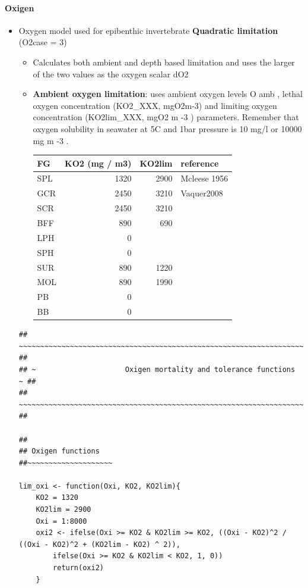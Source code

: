 \documentclass[11pt]{article}
\begin{document}
\paragraph*{Oxigen}
\label{sec-5-2-1-14}
\begin{itemize}

\item Oxygen model used for epibenthic invertebrate \textbf{Quadratic limitation} (O2case = 3)
\label{sec-5-2-1-14-1}%
\begin{itemize}
\item Calculates both ambient and depth based limitation and uses the larger of the two values as the oxygen scalar dO2
\item \textbf{Ambient oxygen limitation}: uses ambient oxygen levels O amb , lethal oxygen concentration (KO2\_XXX, mgO2m-3) and limiting oxygen concentration (KO2lim\_XXX, mgO2 m -3 ) parameters. Remember that oxygen solubility in seawater at 5C and 1bar pressure is 10 mg/l or 10000 mg m -3 .

\begin{center}
\begin{tabular}{lrrl}
 FG   &  KO2 (mg / m3)  &  KO2lim  &  reference     \\
\hline
 SPL  &           1320  &    2900  &  Mcleese 1956  \\
 GCR  &           2450  &    3210  &  Vaquer2008    \\
 SCR  &           2450  &    3210  &                \\
 BFF  &            890  &     690  &                \\
 LPH  &              0  &          &                \\
 SPH  &              0  &          &                \\
 SUR  &            890  &    1220  &                \\
 MOL  &            890  &    1990  &                \\
 PB   &              0  &          &                \\
 BB   &              0  &          &                \\
\end{tabular}
\end{center}


\end{itemize}




\begin{verbatim}
## ~~~~~~~~~~~~~~~~~~~~~~~~~~~~~~~~~~~~~~~~~~~~~~~~~~~~~~~~~~~~~~~~~~~~~~~~~~~~~~~~ ##
## ~                     Oxigen mortality and tolerance functions                 ~ ##
## ~~~~~~~~~~~~~~~~~~~~~~~~~~~~~~~~~~~~~~~~~~~~~~~~~~~~~~~~~~~~~~~~~~~~~~~~~~~~~~~~ ##

##
## Oxigen functions
##~~~~~~~~~~~~~~~~~~~~

lim_oxi <- function(Oxi, KO2, KO2lim){
    KO2 = 1320
    KO2lim = 2900
    Oxi = 1:8000
    oxi2 <- ifelse(Oxi >= KO2 & KO2lim >= KO2, ((Oxi - KO2)^2 / ((Oxi - KO2)^2 + (KO2lim - KO2) ^ 2)),
        ifelse(Oxi >= KO2 & KO2lim < KO2, 1, 0))
        return(oxi2)
    }
\end{verbatim}

\end{itemize} %
\end{document}
